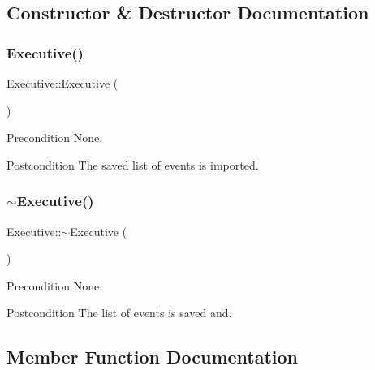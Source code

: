 \subsection{Constructor \& Destructor Documentation}
\mbox{\label{class_executive_ad870c1d741f1f313eb0c5a8336f8af6b}} 
\subsubsection{\texorpdfstring{Executive()}{Executive()}}
{\footnotesize\ttfamily Executive\+::\+Executive (\begin{DoxyParamCaption}{ }\end{DoxyParamCaption})}

\begin{DoxyPrecond}{Precondition}
None. 
\end{DoxyPrecond}
\begin{DoxyPostcond}{Postcondition}
The saved list of events is imported. 
\end{DoxyPostcond}
\mbox{\label{class_executive_a4ce80c499f7640b1770ade77cf56d965}} 
\subsubsection{\texorpdfstring{$\sim$\+Executive()}{~Executive()}}
{\footnotesize\ttfamily Executive\+::$\sim$\+Executive (\begin{DoxyParamCaption}{ }\end{DoxyParamCaption})}

\begin{DoxyPrecond}{Precondition}
None. 
\end{DoxyPrecond}
\begin{DoxyPostcond}{Postcondition}
The list of events is saved and. 
\end{DoxyPostcond}


\subsection{Member Function Documentation}
\mbox{\label{class_executive_a4040f7cecef181324a0dcbb5546faf47}} 

